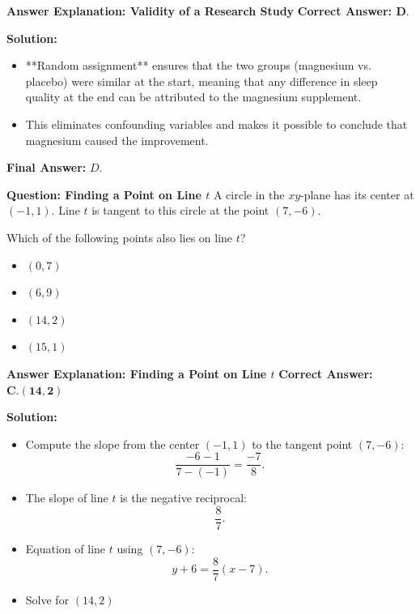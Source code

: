 \documentclass{beamer}
\begin{document}
\begin{frame}{\textbf{Answer Explanation: Validity of a Research Study}}
    \textbf{Correct Answer: \textcolor{novelPurple}{\( \mathbf{D.} \)}}  

    \vspace{0.3cm}
    \textbf{Solution:}
    \begin{itemize}
        \item **Random assignment** ensures that the two groups (magnesium vs. placebo)  
        were similar at the start, meaning that any difference in sleep quality at the end  
        can be attributed to the magnesium supplement.
        \item This eliminates confounding variables and makes it possible to conclude  
        that magnesium caused the improvement.
    \end{itemize}
    \textbf{Final Answer:} \( \boxed{D} \).
\end{frame}



\begin{frame}{\textbf{Question: Finding a Point on Line \( t \)}}
    A circle in the \( xy \)-plane has its center at \( (-1,1) \).  
    Line \( t \) is tangent to this circle at the point \( (7,-6) \).  

    \vspace{0.3cm}
    Which of the following points also lies on line \( t \)?

    \vspace{0.5cm}
    \begin{itemize}
        \item[A.] \( (0,7) \)
        \item[B.] \( (6,9) \)
        \item[C.] \( (14,2) \)
        \item[D.] \( (15,1) \)
    \end{itemize}
\end{frame}

\begin{frame}{\textbf{Answer Explanation: Finding a Point on Line \( t \)}}
    \textbf{Correct Answer: \textcolor{novelPurple}{\( \mathbf{C. (14,2)} \)}}  

    \vspace{0.3cm}
    \textbf{Solution:}
    \begin{itemize}
        \item Compute the slope from the center \( (-1,1) \) to the tangent point \( (7,-6) \):
        \[
        \frac{-6 - 1}{7 - (-1)} = \frac{-7}{8}.
        \]
        \item The slope of line \( t \) is the negative reciprocal:
        \[
        \frac{8}{7}.
        \]
        \item Equation of line \( t \) using \( (7,-6) \):
        \[
        y + 6 = \frac{8}{7}(x - 7).
        \]
        \item Solve for \( (14,2) \)
    \end{itemize}
 
\end{frame}
\end{document}
